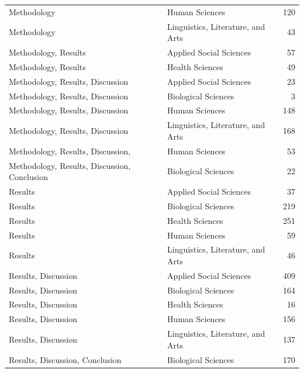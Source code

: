 \begin{longtable}{llr}
Methodology & Human Sciences & 120 \\
Methodology & Linguistics, Literature, and Arts & 43 \\
Methodology, Results & Applied Social Sciences & 57 \\
Methodology, Results & Health Sciences & 49 \\
Methodology, Results, Discussion & Applied Social Sciences & 23 \\
Methodology, Results, Discussion & Biological Sciences & 3 \\
Methodology, Results, Discussion & Human Sciences & 148 \\
Methodology, Results, Discussion & Linguistics, Literature, and Arts & 168 \\
Methodology, Results, Discussion, & Human Sciences & 53 \\
Methodology, Results, Discussion, Conclusion & Biological Sciences & 22 \\
Results & Applied Social Sciences & 37 \\
Results & Biological Sciences & 219 \\
Results & Health Sciences & 251 \\
Results & Human Sciences & 59 \\
Results & Linguistics, Literature, and Arts & 46 \\
Results, Discussion & Applied Social Sciences & 409 \\
Results, Discussion & Biological Sciences & 164 \\
Results, Discussion & Health Sciences & 16 \\
Results, Discussion & Human Sciences & 156 \\
Results, Discussion & Linguistics, Literature, and Arts & 137 \\
Results, Discussion, Conclusion & Biological Sciences & 170 \\
\end{longtable}
